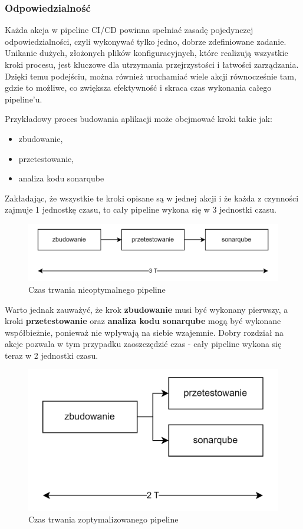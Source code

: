 \documentclass{article}
\begin{document}
\subsubsection{Odpowiedzialność}

Każda akcja w pipeline CI/CD powinna spełniać zasadę pojedynczej odpowiedzialności, czyli wykonywać tylko jedno, dobrze zdefiniowane zadanie. Unikanie dużych, złożonych plików konfiguracyjnych, które realizują wszystkie kroki procesu, jest kluczowe dla utrzymania przejrzystości i łatwości zarządzania. Dzięki temu podejściu, można również uruchamiać wiele akcji równocześnie tam, gdzie to możliwe, co zwiększa efektywność i skraca czas wykonania całego pipeline'u.

Przykładowy proces budowania aplikacji może obejmować kroki takie jak:

\begin{itemize}
    \item zbudowanie,
    \item przetestowanie,
    \item analiza kodu sonarqube
\end{itemize}

Zakładając, że wszystkie te kroki opisane są w jednej akcji i że każda z czynności zajmuje 1 jednostkę czasu, to cały pipeline wykona się w 3 jednostki czasu.

\begin{figure}[H]
    \centering
    \includegraphics[width=1\linewidth]{pipelines3T.png}
    \caption{Czas trwania nieoptymalnego pipeline}
    \label{fig:enter-label}
\end{figure}

Warto jednak zauważyć, że krok \textbf{zbudowanie} musi być wykonany pierwszy, a kroki \textbf{przetestowanie} oraz \textbf{analiza kodu sonarqube} mogą być wykonane współbieżnie, ponieważ nie wpływają na siebie wzajemnie. Dobry rozdział na akcje pozwala w tym przypadku zaoszczędzić czas - cały pipeline wykona się teraz w 2 jednostki czasu.

\begin{figure}[H]
    \centering
    \includegraphics[width=0.5\linewidth]{pipelines2T.png}
    \caption{Czas trwania zoptymalizowanego pipeline}
    \label{fig:enter-label}
\end{figure}
\end{document}
